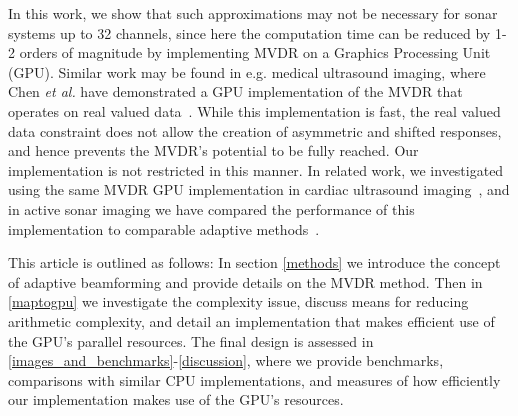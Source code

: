 \documentclass[12pt,journal,draftclsnofoot,onecolumn]{IEEEtran}
\newcounter{todoidx}
\newlength\marginparwidthsmall
\newcommand\todo[1]{%
      \addtocounter{todoidx}{1}%
      {\color{Red}\bf(\thetodoidx{})}%
      \marginpar{%
         {\vspace*{-10pt}\color{Red}\fbox{\bf\thetodoidx{}}}\\%
         \fcolorbox{red}{todobackground}{\parbox{\marginparwidthsmall}{\scriptsize #1}}}}
\newcommand\todo[1]{}
\newcommand\1{\vec 1}
\begin{document}
% 
% 


In this work, we show that such approximations may not be necessary for sonar systems up to 32 channels, since here the computation time can be reduced by 1-2 orders of magnitude by implementing MVDR on a Graphics Processing Unit (GPU). Similar work may be found in e.g. medical ultrasound imaging, where Chen \emph{et al.} have demonstrated a GPU implementation of the MVDR that operates on real valued data~\cite{Chen2011,Chen2011a}. While this implementation is fast, the real valued data constraint does not allow the creation of asymmetric and shifted responses, and hence prevents the MVDR's potential to be fully reached. Our implementation is not restricted in this manner. In related work, we investigated using the same MVDR GPU implementation in cardiac ultrasound imaging~\cite{Asen2012,Asen2013}, and in active sonar imaging we have compared the performance of this implementation to comparable adaptive methods~\cite{Buskenes2013a}.

This article is outlined as follows: In section \ref{methods} we introduce the concept of adaptive beamforming and provide details on the MVDR method. Then in \ref{maptogpu} we investigate the complexity issue, discuss means for reducing arithmetic complexity, and detail an implementation that makes efficient use of the GPU's parallel resources. The final design is assessed in \ref{images_and_benchmarks}-\ref{discussion}, where we provide benchmarks, comparisons with similar CPU implementations, and measures of how efficiently our implementation makes use of the GPU's resources.


\end{document}
